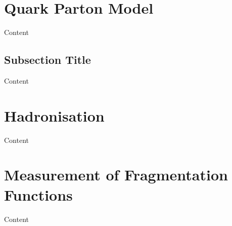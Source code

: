 
\section{Quark Parton Model}

Content


\subsection{Subsection Title}

Content


\section{Hadronisation}

Content


\section{Measurement of Fragmentation Functions}

Content
